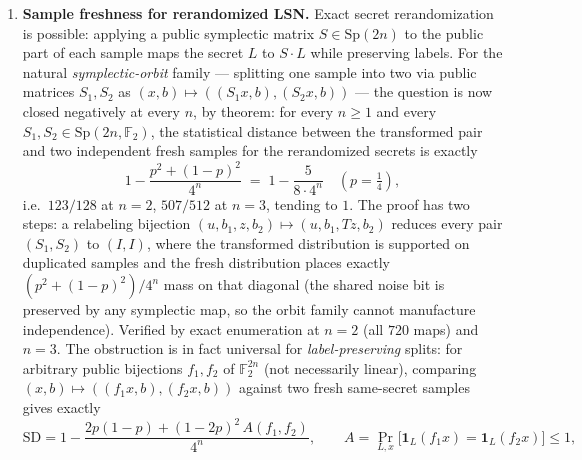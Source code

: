 \documentclass[11pt,a4paper]{article}
\theoremstyle{plain}
\theoremstyle{definition}
\newcommand{\F}{\mathbb{F}}
\begin{document}
\begin{enumerate}
\item \textbf{Sample freshness for rerandomized LSN.} Exact secret rerandomization is possible: applying a public symplectic matrix $S \in \mathrm{Sp}(2n)$ to the public part of each sample maps the secret $L$ to $S\cdot L$ while preserving labels. For the natural \emph{symplectic-orbit} family --- splitting one sample into two via public matrices $S_1,S_2$ as $(x,b)\mapsto((S_1 x,b),(S_2 x,b))$ --- the question is now closed negatively at every $n$, by theorem: for every $n \ge 1$ and every $S_1, S_2 \in \mathrm{Sp}(2n,\F_2)$, the statistical distance between the transformed pair and two independent fresh samples for the rerandomized secrets is exactly
\[
1 - \frac{p^2 + (1-p)^2}{4^{n}} \;=\; 1 - \frac{5}{8\cdot 4^{n}} \quad (p = \tfrac14),
\]
i.e.\ $123/128$ at $n=2$, $507/512$ at $n=3$, tending to $1$. The proof has two steps: a relabeling bijection $(u,b_1,z,b_2) \mapsto (u,b_1,Tz,b_2)$ reduces every pair $(S_1,S_2)$ to $(I, I)$, where the transformed distribution is supported on duplicated samples and the fresh distribution places exactly $(p^2+(1-p)^2)/4^n$ mass on that diagonal (the shared noise bit is preserved by any symplectic map, so the orbit family cannot manufacture independence). Verified by exact enumeration at $n=2$ (all $720$ maps) and $n=3$. The obstruction is in fact universal for \emph{label-preserving} splits: for arbitrary public bijections $f_1, f_2$ of $\F_2^{2n}$ (not necessarily linear), comparing $(x,b) \mapsto ((f_1 x, b), (f_2 x, b))$ against two fresh same-secret samples gives exactly
\[
\mathrm{SD} = 1 - \frac{2p(1-p) + (1-2p)^2\,A(f_1,f_2)}{4^{n}},
\qquad A = \Pr_{L,x}\bigl[\mathbf 1_L(f_1 x) = \mathbf 1_L(f_2 x)\bigr] \le 1,
\]

\end{enumerate}
\end{document}

